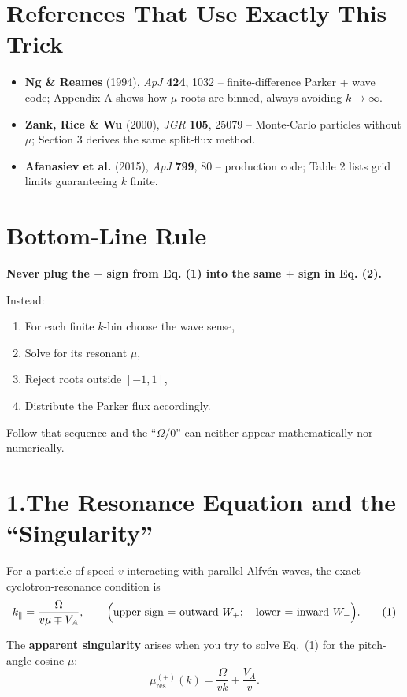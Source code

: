 \section*{References That Use Exactly This Trick}

\begin{itemize}
\item \textbf{Ng \& Reames} (1994), \textit{ApJ} \textbf{424}, 1032 -- finite-difference Parker + wave code; Appendix A shows how $\mu$-roots are binned, always avoiding $k \to \infty$.
\item \textbf{Zank, Rice \& Wu} (2000), \textit{JGR} \textbf{105}, 25079 -- Monte-Carlo particles without $\mu$; Section 3 derives the same split-flux method.
\item \textbf{Afanasiev et al.} (2015), \textit{ApJ} \textbf{799}, 80 -- production code; Table 2 lists grid limits guaranteeing $k$ finite.
\end{itemize}

\section*{Bottom-Line Rule}

\textbf{Never plug the $\pm$ sign from Eq. (1) into the same $\pm$ sign in Eq. (2).}

Instead:
\begin{enumerate}
\item For each finite $k$-bin choose the wave sense,
\item Solve for its resonant $\mu$,
\item Reject roots outside $[-1,1]$,
\item Distribute the Parker flux accordingly.
\end{enumerate}

Follow that sequence and the ``$\Omega / 0$'' can neither appear mathematically nor numerically.


\section*{1.\quad The Resonance Equation and the ``Singularity''}

For a particle of speed $v$ interacting with parallel Alfvén waves, the exact cyclotron-resonance condition is
\[
k_\parallel = \frac{\Omega}{v \mu \mp V_A},
\qquad
\Bigl(\text{upper sign = outward } W_{+};\quad \text{lower = inward } W_{-}\Bigr).
\tag{1}
\]

The \textbf{apparent singularity} arises when you try to solve Eq.~(1) for the pitch-angle cosine $\mu$:
\[
\mu_{\text{res}}^{(\pm)}(k) = \frac{\Omega}{v k} \pm \frac{V_A}{v}.
\tag{2}
\]

